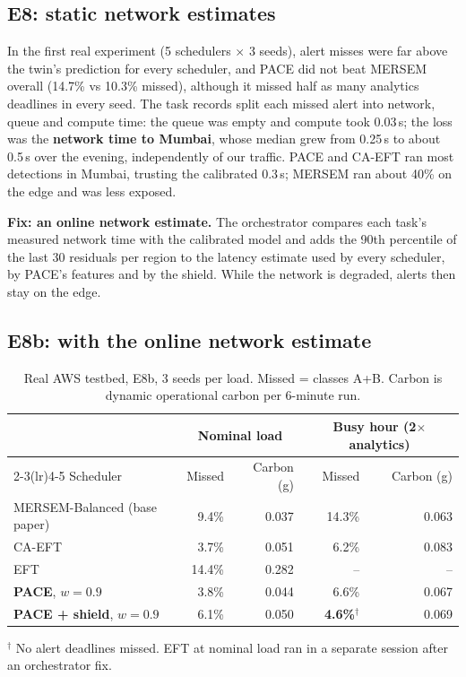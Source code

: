 \documentclass[11pt,a4paper]{article}
\begin{document}
\subsection{E8: static network estimates}
In the first real experiment (5 schedulers $\times$ 3 seeds), alert misses were far above the twin's prediction for every scheduler, and PACE did not beat MERSEM overall (14.7\% vs 10.3\% missed), although it missed half as many analytics deadlines in every seed. The task records split each missed alert into network, queue and compute time: the queue was empty and compute took 0.03\,s; the loss was the \textbf{network time to Mumbai}, whose median grew from 0.25\,s to about 0.5\,s over the evening, independently of our traffic. PACE and CA-EFT ran most detections in Mumbai, trusting the calibrated 0.3\,s; MERSEM ran about 40\% on the edge and was less exposed.

\textbf{Fix: an online network estimate.} The orchestrator compares each task's measured network time with the calibrated model and adds the 90th percentile of the last 30 residuals per region to the latency estimate used by every scheduler, by PACE's features and by the shield. While the network is degraded, alerts then stay on the edge.

\subsection{E8b: with the online network estimate}

\begin{table}[H]
\centering\small
\caption{Real AWS testbed, E8b, 3 seeds per load. Missed = classes A+B. Carbon is dynamic operational carbon per 6-minute run.}
\label{tab:e8b}
\begin{tabular}{lrrrr}
\toprule
& \multicolumn{2}{c}{Nominal load} & \multicolumn{2}{c}{Busy hour (2$\times$ analytics)} \\
\cmidrule(lr){2-3}\cmidrule(lr){4-5}
Scheduler & Missed & Carbon (g) & Missed & Carbon (g) \\
\midrule
MERSEM-Balanced (base paper) & 9.4\% & 0.037 & 14.3\% & 0.063 \\
CA-EFT & 3.7\% & 0.051 & 6.2\% & 0.083 \\
EFT & 14.4\% & 0.282 & -- & -- \\
\textbf{PACE}, $w=0.9$ & 3.8\% & 0.044 & 6.6\% & 0.067 \\
\textbf{PACE + shield}, $w=0.9$ & 6.1\% & 0.050 & \textbf{4.6\%}$^\dagger$ & 0.069 \\
\bottomrule
\end{tabular}

\smallskip\footnotesize $^\dagger$ No alert deadlines missed. EFT at nominal load ran in a separate session after an orchestrator fix.
\end{table}
\end{document}
